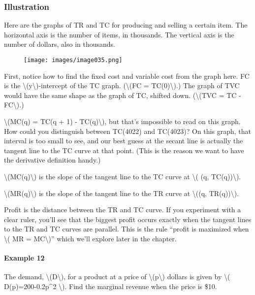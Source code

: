 \hypertarget{illustration}{%
\subsubsection{Illustration}\label{illustration}}

Here are the graphs of TR and TC for producing and selling a certain
item. The horizontal axis is the number of items, in thousands. The
vertical axis is the number of dollars, also in thousands.

\begin{figure}
\centering
\texttt{[image: images/image035.png]}
\caption{}
\end{figure}

First, notice how to find the fixed cost and variable cost from the
graph here. FC is the \textbackslash{}(y\textbackslash{})-intercept of
the TC graph. (\textbackslash{}(FC = TC(0)\textbackslash{}).) The graph
of TVC would have the same shape as the graph of TC, shifted down.
(\textbackslash{}(TVC = TC - FC\textbackslash{}).)

\textbackslash{}(MC(q) = TC(q + 1) - TC(q)\textbackslash{}), but that's
impossible to read on this graph. How could you distinguish between
TC(4022) and TC(4023)? On this graph, that interval is too small to see,
and our best guess at the secant line is actually the tangent line to
the TC curve at that point. (This is the reason we want to have the
derivative definition handy.)

\textbackslash{}(MC(q)\textbackslash{}) is the slope of the tangent line
to the TC curve at \textbackslash{}( (q, TC(q))\textbackslash{}).

\textbackslash{}(MR(q)\textbackslash{}) is the slope of the tangent line
to the TR curve at \textbackslash{}((q, TR(q))\textbackslash{}).

Profit is the distance between the TR and TC curve. If you experiment
with a clear ruler, you'll see that the biggest profit occurs exactly
when the tangent lines to the TR and TC curves are parallel. This is the
rule ``profit is maximized when \textbackslash{}( MR =
MC\textbackslash{})'' which we'll explore later in the chapter.

\hypertarget{example-12}{%
\paragraph{Example 12}\label{example-12}}

The demand, \textbackslash{}(D\textbackslash{}), for a product at a
price of \textbackslash{}(p\textbackslash{}) dollars is given by
\textbackslash{}( D(p)=200-0.2p\^{}2 \textbackslash{}). Find the
marginal revenue when the price is \$10.

